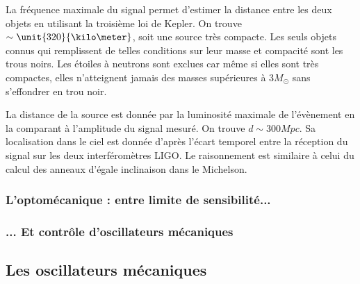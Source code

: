 \documentclass[12pt,a4paper]{article}
\begin{document}
La fréquence maximale du signal permet d'estimer la distance entre les deux objets en utilisant la troisième loi de Kepler.
On trouve $\sim \unit{320}{\kilo\meter}$, soit une source très compacte.
Les seuls objets connus qui remplissent de telles conditions sur leur masse et compacité sont les trous noirs.
Les étoiles à neutrons sont exclues car même si elles sont très compactes, elles n'atteignent jamais des masses supérieures à $\unit{3}{M_\odot}$ sans s'effondrer en trou noir.

La distance de la source est donnée par la luminosité maximale de l'évènement en la comparant à l'amplitude du signal mesuré.
On trouve $d \sim\unit{300}{Mpc}$.
Sa localisation dans le ciel est donnée d'après l'écart temporel entre la réception du signal sur les deux interféromètres LIGO.
Le raisonnement est similaire à celui du calcul des anneaux d'égale inclinaison dans le Michelson.

\subsubsection{L'optomécanique : entre limite de sensibilité...}

\subsubsection{... Et contrôle d'oscillateurs mécaniques}

\subsection{Les oscillateurs mécaniques}
\label{sec:mechanical_oscillators}
\end{document}
